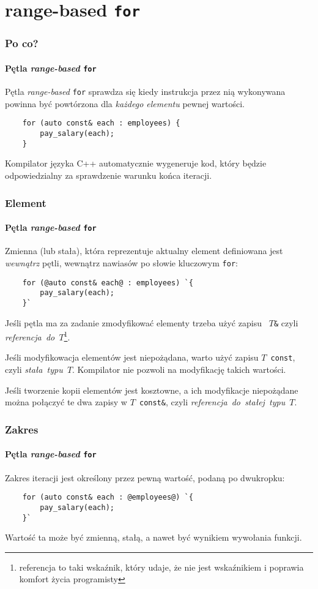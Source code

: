 \documentclass[aspectratio=169]{beamer}
\begin{document}
\section{range-based {\tt for}}

\begin{frame}[fragile]
    \frametitle{Po co?}
    \framesubtitle{Pętla \emph{range-based} {\tt for}}

    Pętla \emph{range-based} {\tt for} sprawdza się kiedy instrukcja przez nią
    wykonywana powinna być powtórzona dla \emph{każdego elementu} pewnej
    wartości.

    \begin{lstlisting}
    for (auto const& each : employees) {
        pay_salary(each);
    }
    \end{lstlisting}

    Kompilator języka C++ automatycznie wygeneruje kod, który będzie
    odpowiedzialny za sprawdzenie warunku końca iteracji.
\end{frame}

\begin{frame}[fragile]
    \frametitle{Element}
    \framesubtitle{Pętla \emph{range-based} {\tt for}}

    Zmienna (lub stała), która reprezentuje aktualny element definiowana jest
    \emph{wewnątrz} pętli, wewnątrz nawiasów po słowie kluczowym {\tt for}:

    \begin{lstlisting}
    for (@auto const& each@ : employees) `{
        pay_salary(each);
    }`
    \end{lstlisting}

    {\footnotesize
    Jeśli pętla ma za zadanie zmodyfikować elementy trzeba użyć zapisu {\tt
    $T$\&}
    czyli \emph{referencja~do~$T$}\footnote{referencja to taki wskaźnik, który
    udaje, że nie jest wskaźnikiem i poprawia komfort życia programisty}.

    Jeśli modyfikowacja elementów jest niepożądana, warto użyć zapisu
    {\tt $T$ const}, czyli \emph{stała~typu~$T$}. Kompilator nie pozwoli na
    modyfikację takich wartości.

    Jeśli tworzenie kopii elementów jest kosztowne, a ich modyfikacje
    niepożądane można połączyć te dwa zapisy w {\tt$T$ const\&}, czyli
    \emph{referencja~do~stałej~typu~$T$}.
    }
\end{frame}

\begin{frame}[fragile]
    \frametitle{Zakres}
    \framesubtitle{Pętla \emph{range-based} {\tt for}}

    Zakres iteracji jest określony przez pewną wartość, podaną po dwukropku:

    \begin{lstlisting}
    for (auto const& each : @employees@) `{
        pay_salary(each);
    }`
    \end{lstlisting}

    Wartość ta może być zmienną, stałą, a nawet być wynikiem wywołania funkcji.
\end{frame}
\end{document}
